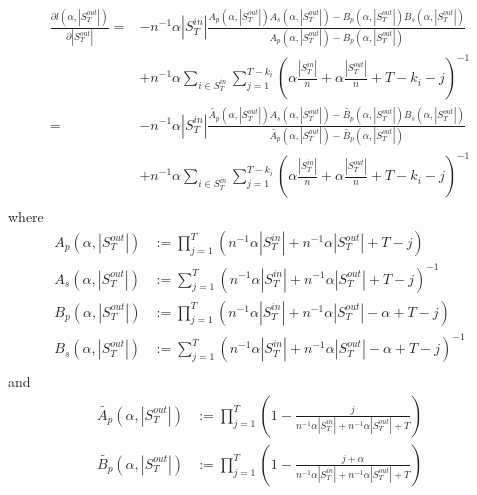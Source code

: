 \documentclass[a4paper, 12pt]{article}
\newcommand{\sout}[1][T]{|S^{out}_{#1}|}
\newcommand{\sint}[1][T]{|S^{in}_{#1}|}
\begin{document}
\begin{align} \label{eq:9}
   \frac{\partial l(\alpha, \sout)}{\partial \sout} =& -n^{-1} \alpha \sint \frac{A_p(\alpha, \sout) A_s(\alpha, \sout) - B_p(\alpha, \sout) B_s(\alpha, \sout)}{A_p(\alpha, \sout) - B_p(\alpha, \sout)}\nonumber \\
    &+ n^{-1}\alpha \sum_{i \in S_T^{in}} \sum_{j = 1}^{T - k_i} (\alpha \frac{\sint}{n} + \alpha \frac{\sout}{n} + T - k_i - j)^{-1} \nonumber \\
    =& -n^{-1} \alpha \sint \frac{\widetilde{A_p}(\alpha, \sout) A_s(\alpha, \sout) - \widetilde{B_p}(\alpha, \sout) B_s(\alpha, \sout)}{\widetilde{A_p}(\alpha, \sout) - \widetilde{B_p}(\alpha, \sout)}\nonumber \\
    &+ n^{-1}\alpha \sum_{i \in S_T^{in}} \sum_{j = 1}^{T - k_i} (\alpha \frac{\sint}{n} + \alpha \frac{\sout}{n} + T - k_i - j)^{-1} \nonumber \\
\end{align}
where
\begin{align*}
A_p(\alpha, \sout) &:= \prod_{j=1}^T(n^{-1}\alpha \sint + n^{-1} \alpha \sout + T - j) \\
A_s(\alpha, \sout) &:= \sum_{j = 1}^{T} (n^{-1}\alpha \sint + n^{-1} \alpha \sout + T - j)^{-1} \\
B_p(\alpha, \sout) &:= \prod_{j=1}^T (n^{-1} \alpha \sint + n^{-1} \alpha \sout - \alpha + T - j) \\
B_s(\alpha, \sout) &:= \sum_{j = 1}^{T} (n^{-1} \alpha \sint + n^{-1} \alpha \sout - \alpha + T - j)^{-1} \\
\end{align*}
and
\begin{align*}
\widetilde{A_p}(\alpha, \sout) &:= \prod_{j=1}^T \left(1 - \frac{j}{n^{-1}\alpha \sint + n^{-1} \alpha \sout + T}\right) \\
\widetilde{B_p}(\alpha, \sout) &:= \prod_{j=1}^T \left(1 - \frac{j + \alpha}{n^{-1} \alpha \sint + n^{-1} \alpha \sout + T}\right)\\
\end{align*}
\end{document}
